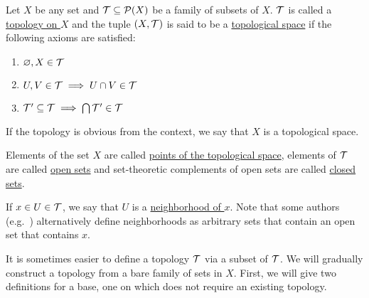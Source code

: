 \begin{definition}\label{def:topological_space}\cite[21]{Lectures:general_topology}
  Let $X$ be any set and $\mathcal T \subseteq \operatorname{\mathcal P}(X)$ be a family of subsets of $X$. $\mathcal T$ is called a \uline{topology on $X$} and the tuple $(X, \mathcal T)$ is said to be a \uline{topological space} if the following axioms are satisfied:
  \begin{enumerate}[label={\textbf{O\arabic*)}}]
    \item\label{def:topological_space/O1} $\varnothing, X \in \mathcal T$
    \item\label{def:topological_space/O2} $U, V \in \mathcal T \implies U \cap V \in \mathcal T$
    \item\label{def:topological_space/O3} $\mathcal T' \subseteq \mathcal T \implies \bigcap \mathcal T' \in \mathcal T$
  \end{enumerate}

  If the topology is obvious from the context, we say that $X$ is a topological space.

  Elements of the set $X$ are called \uline{points of the topological space}, elements of $\mathcal T$ are called \uline{open sets} and set-theoretic complements of open sets are called \uline{closed sets}.

  If $x \in U \in \mathcal T$, we say that $U$ is a \uline{neighborhood of $x$}. Note that some authors (e.g.~\cite[38]{Kelley1955}) alternatively define neighborhoods as arbitrary sets that contain an open set that contains $x$.
\end{definition}

It is sometimes easier to define a topology $\mathcal T$ via a subset of $\mathcal T$. We will gradually construct a topology from a bare family of sets in $X$. First, we will give two definitions for a base, one on which does not require an existing topology.

